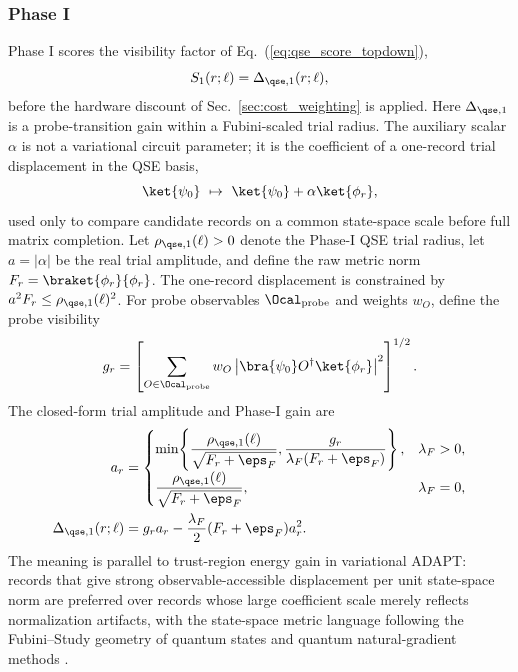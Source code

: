 \subsubsection{Phase I}
\label{sec:phase1}

Phase I scores the visibility factor of Eq.~(\ref{eq:qse_score_topdown}),
\begin{equation}
S_1(r;\ell)=\Delta_{\qse,1}(r;\ell),
\label{eq:qse_phase1_score}
\end{equation}
before the hardware discount of Sec.~\ref{sec:cost_weighting} is applied.  Here $\Delta_{\qse,1}$ is a probe-transition gain within a Fubini-scaled trial radius.  The auxiliary scalar $\alpha$ is not a variational circuit parameter; it is the coefficient of a one-record trial displacement in the QSE basis,
\begin{equation}
\ket{\psi_0}\ \mapsto\ \ket{\psi_0}+\alpha\ket{\phi_r},
\label{eq:qse_phase1_trial_displacement}
\end{equation}
used only to compare candidate records on a common state-space scale before full matrix completion.  Let $\rho_{\qse,1}(\ell)>0$ denote the Phase-I QSE trial radius, let $a=|\alpha|$ be the real trial amplitude, and define the raw metric norm $F_r=\braket{\phi_r}{\phi_r}$.  The one-record displacement is constrained by $a^2F_r\le \rho_{\qse,1}(\ell)^2$.  For probe observables $\Ocal_{\rm probe}$ and weights $w_O$, define the probe visibility
\begin{equation}
g_r=
\left[
\sum_{O\in\Ocal_{\rm probe}}w_O
\left|
\bra{\psi_0}O^\dagger\ket{\phi_r}
\right|^2
\right]^{1/2} .
\label{eq:qse_probe_gain}
\end{equation}  The closed-form trial amplitude and Phase-I gain are
\begin{equation}
\begin{aligned}
a_r
&=
\begin{cases}
\displaystyle
\min\!\left\{
\frac{\rho_{\qse,1}(\ell)}{\sqrt{F_r+\eps_F}},
\frac{g_r}{\lambda_F(F_r+\eps_F)}
\right\},&\lambda_F>0,\\[2ex]
\displaystyle
\frac{\rho_{\qse,1}(\ell)}{\sqrt{F_r+\eps_F}},&\lambda_F=0,
\end{cases}
\\
\Delta_{\qse,1}(r;\ell)
&=
g_ra_r-\frac{\lambda_F}{2}(F_r+\eps_F)a_r^2 .
\end{aligned}
\label{eq:qse_phase1_gain}
\end{equation}
The meaning is parallel to trust-region energy gain in variational ADAPT: records that give strong observable-accessible displacement per unit state-space norm are preferred over records whose large coefficient scale merely reflects normalization artifacts, with the state-space metric language following the Fubini--Study geometry of quantum states and quantum natural-gradient methods \cite{ProvostVallee1980,Stokes2020QNG}.

